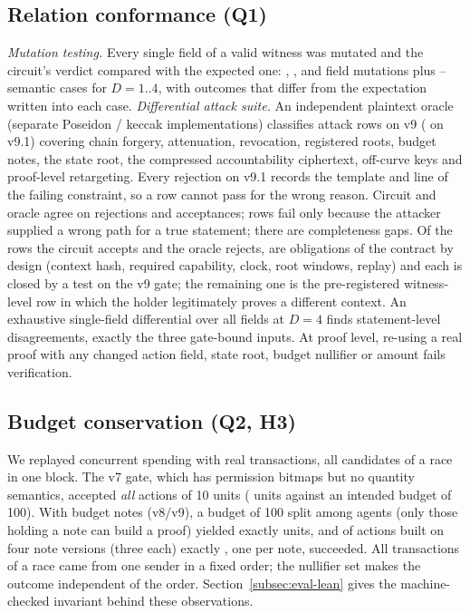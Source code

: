 \subsection{Relation conformance (Q1)}
\label{subsec:eval-conformance}
\emph{Mutation testing.} Every single field of a valid witness was mutated and the circuit's verdict compared with the expected one:
\NMutFieldA, \NMutFieldB, \NMutFieldC{} and \NMutFieldD{} field mutations plus \NMutSemA--\NMutSemD{} semantic cases for $D=1..4$,
with \NMutUnexpD{} outcomes that differ from the expectation written into each case.
\emph{Differential attack suite.} An independent plaintext oracle (separate Poseidon / keccak implementations) classifies \NTthreeRows{} attack
rows on v9 (\NTthreeOneRows{} on v9.1) covering chain forgery, attenuation, revocation, registered roots, budget notes, the state root, the compressed accountability
ciphertext, off-curve keys and proof-level retargeting. Every rejection on v9.1 records the template and line of the failing constraint, so a row cannot
pass for the wrong reason. Circuit and oracle agree on \NTthreeAgRej{} rejections and \NTthreeAgAcc{} acceptances; \NTthreeBwo{} rows fail only because
the attacker supplied a wrong path for a true statement; there are \NTthreeGap{} completeness gaps. Of the \NTthreeFa{} rows the circuit accepts
and the oracle rejects, \NTthreeFaPolicy{} are obligations of the contract by design (context hash, required capability, clock, root windows,
replay) and each is closed by a test on the v9 gate; the remaining one is the pre-registered witness-level row in which the holder legitimately proves a
different context. An exhaustive single-field differential over all \NExTotal{} fields at $D=4$ finds \NExStmt{} statement-level disagreements,
exactly the three gate-bound inputs. At proof level, re-using a real proof with any changed action field, state root, budget nullifier or amount
fails verification.

\subsection{Budget conservation (Q2, H3)}
\label{subsec:eval-budget}
We replayed concurrent spending with real transactions, all candidates of a race in one block. The v7 gate, which has permission bitmaps but no
quantity semantics, accepted \emph{all} \NEtwoVsevenSub{} actions of 10 units (\NEtwoVsevenAcc{} units against an intended budget of 100). With budget notes (v8/v9),
a budget of 100 split among \NEtwoVeightAtt{} agents (only those holding a note can build a proof) yielded exactly \NEtwoVeightAcc{} units, and of \NEtwoSameSub{} actions
built on four note versions (three each) exactly \NEtwoSameOk{}, one per note, succeeded. All transactions of a race came from one sender in a fixed
order; the nullifier set makes the outcome independent of the order. Section~\ref{subsec:eval-lean} gives the machine-checked invariant behind these observations.

